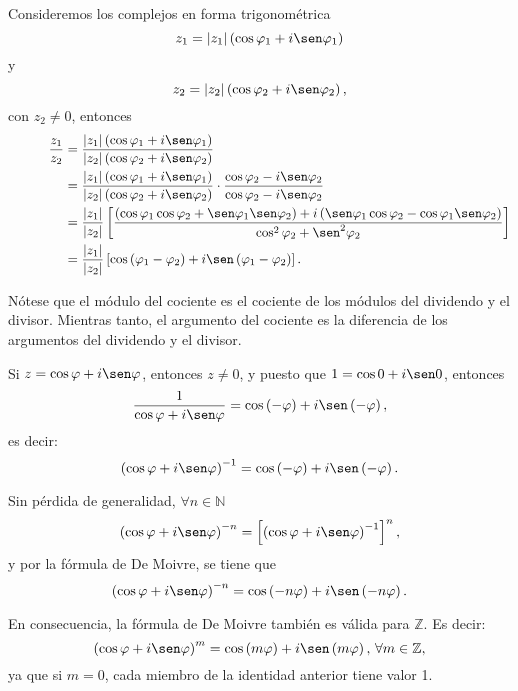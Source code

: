 Consideremos los complejos en forma trigonométrica
$$z_1=|z_1| \left( \cos \varphi _1+i \sen \varphi _1 \right)$$
y
$$z_2=|z_2| \left( \cos \varphi _2+i \sen \varphi _2 \right),$$
con $z_2 \neq 0$, entonces
\begin{align*}
    \quad\quad\quad\frac{z_1}{z_2} &= \frac{|z_1| \left( \cos \varphi _1 +i \sen \varphi _1 \right)}{|z_2| \left( \cos \varphi _2 +i \sen \varphi _2 \right)} \\
    &=\frac{|z_1| \left( \cos \varphi _1 +i \sen \varphi _1 \right)}{|z_2| \left( \cos \varphi _2 +i \sen \varphi _2 \right)} \cdot \frac{\cos \varphi _2 - i \sen \varphi _2}{\cos \varphi _2 -i \sen \varphi _2} \\
    &= \frac{|z_1|}{|z_2|} \left[ \frac{ \left( \cos \varphi _1 \cos \varphi _2 + \sen \varphi _1 \sen \varphi _2 \right) + i \left( \sen \varphi _1 \cos \varphi _2 - \cos \varphi _1 \sen \varphi _2 \right)}{\cos ^2 \varphi _2 + \sen ^2 \varphi _2} \right] \\
    &= \frac{|z_1|}{|z_2|} \left[ \cos \left( \varphi _1 - \varphi _2 \right) + i \sen \left( \varphi _1 - \varphi _2 \right) \right].
\end{align*}

Nótese que el módulo del cociente es el cociente de los módulos del dividendo y el divisor. Mientras tanto, el argumento del cociente es la diferencia de los argumentos del dividendo y el divisor.

Si $z=\cos \varphi +i \sen \varphi $, entonces $z \neq 0$, y puesto que $1=\cos 0 +i \sen 0$, entonces
$$\frac{1}{\cos \varphi +i \sen \varphi} = \cos \left( - \varphi \right)+i \sen \left( -\varphi \right),$$
es decir:
$$\left( \cos \varphi +i \sen \varphi \right)^{-1}=\cos \left( - \varphi \right)+i \sen \left( -\varphi \right).$$

Sin pérdida de generalidad, $\forall n \in \mathbb{N}$
$$\left( \cos \varphi +i \sen \varphi \right)^{-n}=\left[ \left( \cos \varphi +i \sen \varphi \right)^{-1} \right]^n,$$
y por la fórmula de De Moivre, se tiene que
$$\left( \cos \varphi +i \sen \varphi \right)^{-n}=\cos \left( -n \varphi \right) +i \sen \left( -n\varphi \right).$$

En consecuencia, la fórmula de De Moivre también es válida para $\mathbb{Z}$. Es decir:
$$\left( \cos \varphi +i \sen \varphi \right)^{m}=\cos \left( m \varphi \right) +i \sen \left( m \varphi \right), \, \forall m \in \mathbb{Z},$$
ya que si $m=0$, cada miembro de la identidad anterior tiene valor 1.

